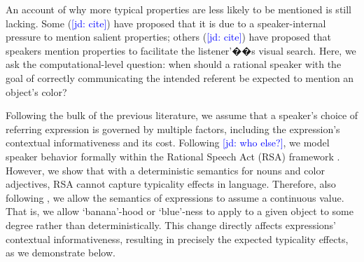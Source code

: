 \documentclass[10pt,letterpaper]{article}
\newcommand{\jd}[1]{\textcolor{Blue}{[jd: #1]}}
\begin{document}


An account of why more typical properties are less likely to be mentioned is still lacking. Some (\jd{cite}) have proposed that it is due to a speaker-internal pressure to mention salient properties; others (\jd{cite}) have proposed that speakers mention properties to facilitate the listener'��s visual search. Here, we ask the computational-level question: when should a rational speaker with the goal of correctly communicating the intended referent be expected to mention an object's color?

Following the bulk of the previous literature, we assume that a speaker's choice of referring expression is governed by multiple factors, including the expression's contextual informativeness and its cost. Following   \jd{who else?}, we model speaker behavior formally within the Rational Speech Act (RSA) framework \cite{frank2012, GoodmanFrank2016}. However, we show that with a deterministic semantics for nouns and color adjectives, RSA cannot capture typicality effects in language. Therefore, also following , we allow the semantics of expressions to assume a continuous value. That is, we allow `banana'-hood or `blue'-ness to apply to a given object to some degree rather than deterministically. This change directly affects expressions' contextual informativeness, resulting in precisely the expected typicality effects, as we demonstrate below.
\end{document}
